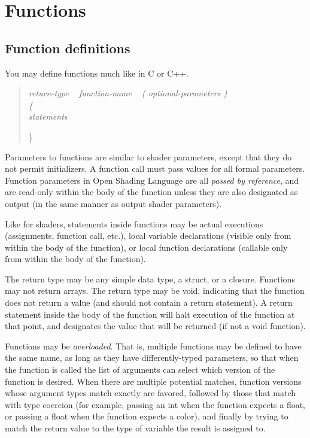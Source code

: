 \documentclass[11pt,letterpaper]{book}
\def\langname{Open Shading Language\xspace}
\def\color{{\cf color}\xspace}
\begin{document}
\section{Functions}
\label{sec:functions}

\subsection{Function definitions}
\label{sec:syntax:functiondefinitions}

You may define functions much like in C or C++.

\begin{quote}
\em
return-type ~ function-name ~ {\rm\cf (} optional-parameters {\rm\cf )} \\
\rm
{\cf \{ } \\
\em
\spc statements

{\cf \} }
\end{quote}

Parameters to functions are similar to shader parameters, except that
they do not permit initializers.  A function call must pass values for
all formal parameters.  Function parameters in \langname are all
\emph{passed by reference}, and are read-only within the body of the
function unless they are also designated as {\cf output} (in the same
manner as output shader parameters).

Like for shaders, statements inside functions may be actual executions
(assignments, function call, etc.), local variable declarations (visible
only from within the body of the function), or local function
declarations (callable only from within the body of the function).

The return type may be any simple data type, a {\cf struct}, or a {\cf
  closure}.  Functions may not return arrays.  The return type may be
{\cf void}, indicating that the function does not return a value (and
should not contain a {\cf return} statement).  A {\cf return} statement
inside the body of the function will halt execution of the function at
that point, and designates the value that will be returned (if not a
{\cf void} function).

Functions may be \emph{overloaded}.  That is, multiple functions may be
defined to have the same name, as long as they have differently-typed
parameters, so that when the function is called the list of arguments can
select which version of the function is desired. When there are multiple
potential matches, function versions whose argument types match exactly are
favored, followed by those that match with type coercion (for example,
passing an {\cf int} when the function expects a {\cf float}, or passing a
{\cf float} when the function expects a \color), and finally by trying to
match the return value to the type of variable the result is assigned to.
\end{document}
